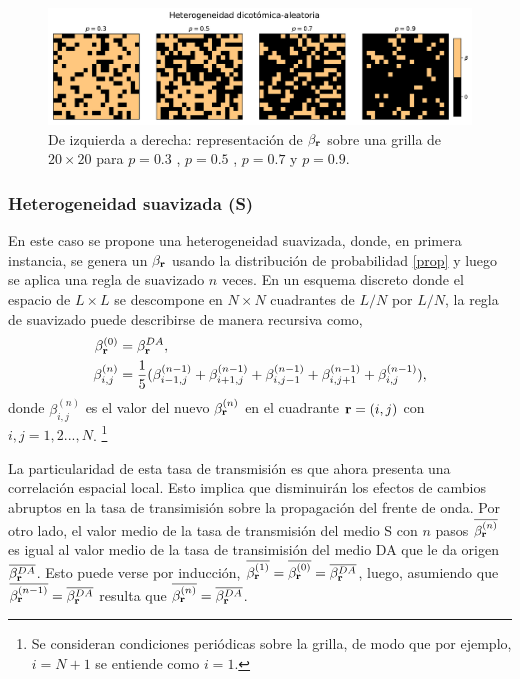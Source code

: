 \begin{figure}[t]
  \centering
  \includegraphics[width=1\textwidth]{heterogeneidad_dicot_aleatoria.pdf}
  \caption{De izquierda a derecha: representación de $\beta_{\vb r}$ sobre una grilla de $20 \times 20$ para  $p=0.3$ , $p=0.5$ , $p=0.7$ y $p=0.9$.}
  \label{fig:heterogeneidad_dicotómica_aleatoria}
\end{figure}

\subsubsection*{Heterogeneidad suavizada (S)}

En este caso se propone una heterogeneidad suavizada, donde, en primera instancia, se genera un $\beta_{\vb r}$ usando la distribución
de probabilidad \ref{prop} y luego se aplica una regla de suavizado $n$ veces. En un esquema discreto donde el espacio de $L\times L$ se descompone en
$N\times N$ cuadrantes de $L/N$ por $L/N$, la regla de suavizado puede describirse de manera recursiva como,
\begin{align}
  \beta^{(0)}_{\vb r} &= \beta_{\vb r}^{DA},\\ 
  \beta^{(n)}_{i,j} &= \frac{1}{5} (\beta^{(n-1)}_{i-1,j} + \beta^{(n-1)}_{i+1,j} + \beta^{(n-1)}_{i,j-1} + \beta^{(n-1)}_{i,j+1} + \beta^{(n-1)}_{i,j}),\label{suavizado}
\end{align}
donde $\beta^{(n)}_{i,j}$ es el valor del nuevo $\beta^{(n)}_{\vb r}$ en el cuadrante $\vb r =(i,j)$ con $i,j = 1,2...,N$.
\footnote{Se consideran condiciones periódicas sobre la grilla, de modo que por ejemplo, $i=N+1$ se entiende como $i=1$.} 

La particularidad de esta
tasa de transmisión es que ahora presenta una correlación espacial local. Esto implica que disminuirán los efectos de cambios abruptos en la tasa de 
transimisión sobre la propagación del frente de onda. Por otro lado, el valor medio de la tasa de transmisión del medio S con $n$ pasos $\overline{\beta^{(n)}_{\vb r}}$ es igual al valor medio de la tasa de transimisión del medio DA que le da origen $\overline{\beta_{\vb r}^{DA}}$. Esto puede verse por inducción, $\overline{\beta^{(1)}_{\vb r}}=\overline{\beta^{(0)}_{\vb r}}=\overline{\beta_{\vb r}^{DA}}$,
luego, asumiendo que $\overline{\beta^{(n-1)}_{\vb r}}=\overline{\beta_{\vb r}^{DA}}$ resulta que $\overline{\beta^{(n)}_{\vb r}}=\overline{\beta_{\vb r}^{DA}}$.

